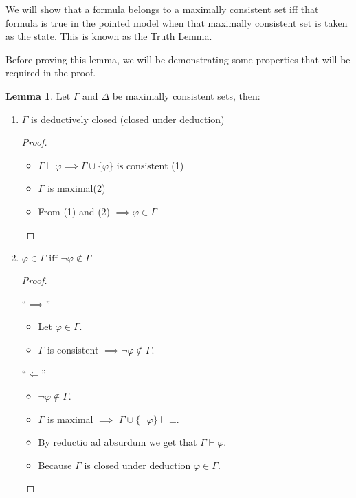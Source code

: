 \documentclass[12pt]{article}
\numberwithin{equation}{section}
\theoremstyle{definition}
\newtheorem{lem}[thm]{Lemma}
\theoremstyle{definition}
\theoremstyle{remark}
\begin{document}
We will show that a formula belongs to a maximally consistent set iff that formula is true in the pointed model when that maximally consistent set is taken as the state. This is known as the Truth Lemma.

Before proving this lemma, we will be demonstrating some properties that will be required in the proof.

\begin{lem}

Let $\Gamma$ and $\Delta$ be maximally consistent sets, then:
\begin{enumerate}
    \item $\Gamma$ is deductively closed (closed under deduction)
    \begin{proof}
    
    ~
    
    \begin{itemize}
        \item $\Gamma \vdash \varphi \implies \Gamma \cup \{ \varphi \} \text{ is consistent} $ (1)
        \item $\Gamma$ is maximal(2)
        \item From (1) and (2) $\implies \varphi \in \Gamma$ 
    \end{itemize}
    \end{proof}
    \item $\varphi \in \Gamma \text{ iff } \neg\varphi \notin \Gamma$
    
    \begin{proof}
    ~
    
    ``$\implies$''
    \begin{itemize}
    \item Let $\varphi \in \Gamma$.
    \item $\Gamma$ is consistent $\implies \neg \varphi \notin \Gamma$.
    \end{itemize}
    ``$\Longleftarrow $''
    \begin{itemize}
    \item $\neg \varphi \notin \Gamma$.
    \item $\Gamma$ is maximal $\implies$ $\Gamma \cup \{\neg \varphi \} \vdash \bot$.
    \item By reductio ad absurdum we get that $\Gamma \vdash \varphi$.
    
    \item Because $\Gamma$ is closed under deduction $\varphi \in \Gamma$.
    \end{itemize}
    \end{proof}
    

\end{enumerate}
\end{lem}
\end{document}

